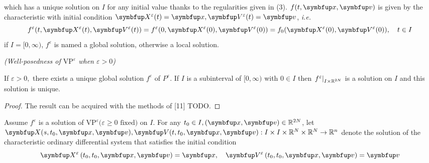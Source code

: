\begin{definition}
\begin{enumerate}[(1)]
        which has a unique solution on $I$ for any initial value thanks to the regularities given in (3). $f(t,\vx, \vv)$ is given by the characteristic with initial condition $\vect{X}^\varepsilon(t)= \vx, \vect{V}^\varepsilon(t)= \vv$, \textit{i.e.}
        \[
        f^{\varepsilon}(t, \vect{X}^\varepsilon(t), \vect{V}^\varepsilon(t))=f^{\varepsilon}(0, \vect{X}^\varepsilon(0), \vect{V}^\varepsilon(0))=f_{0}(\vect{X}^\varepsilon(0), \vect{V}^\varepsilon(0)), \quad t \in I
        \]
        if $I=[0, \infty)$, $f^{\varepsilon}$ is named a global solution, otherwise a local solution.
    \end{enumerate}

\end{definition}







\begin{theorem}\textit{(Well-posedness of $\text{VP}^\varepsilon$ when $\varepsilon>0$)}

If $\varepsilon>0,$ there exists a unique global solution $f^\varepsilon$ of $P^{\varepsilon}$. If $I$ is a subinterval of $[0, \infty)$ with $0 \in I$ then $\left.f^{\varepsilon}\right|_{I \times {\mathbb{R}}^{2N}}$ is a solution on $I$ and this solution is unique.
\end{theorem} 
\begin{proof}
    The result can be acquired with the methods of [11] TODO.
\end{proof}

\begin{definition}
    Assume $f^{\varepsilon}$ is a solution of $\text{VP}^{\varepsilon}(\varepsilon \geqslant 0 \text { fixed) on } I$. For any $t_{0} \in I, (\vx,\vv) \in \bbR^{2 N}$, let $\vect{X}( s , t_0,\vx,\vv), \vect{V}( t , t_0,\vx,\vv) : I \times I \times \bbR^N \times \bbR^N \rightarrow \bbR^n$ denote the solution of the characteristic ordinary differential system that
    satisfies the initial condition
    $$\vect{X}^{\varepsilon}\left(t_{0}, t_{0}, \vx,\vv \right)=\vx, \quad \vect{V}^{\varepsilon}\left(t_{0}, t_{0}, \vx,\vv \right)=\vv$$
\end{definition}

